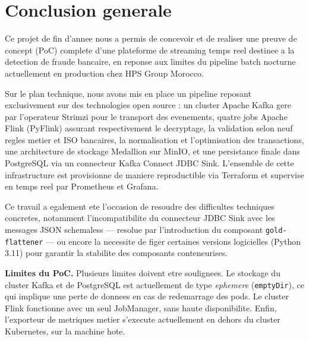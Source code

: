 
\chapter*{Conclusion generale}

Ce projet de fin d'annee nous a permis de concevoir et de realiser une preuve de
concept (PoC) complete d'une plateforme de streaming temps reel destinee a la
detection de fraude bancaire, en reponse aux limites du pipeline batch nocturne
actuellement en production chez HPS Group Morocco.

Sur le plan technique, nous avons mis en place un pipeline reposant exclusivement sur
des technologies open source : un cluster Apache Kafka gere par l'operateur Strimzi
pour le transport des evenements, quatre jobs Apache Flink (PyFlink) assurant
respectivement le decryptage, la validation selon neuf regles metier et ISO
bancaires, la normalisation et l'optimisation des transactions, une architecture de
stockage Medallion sur MinIO, et une persistance finale dans PostgreSQL via un
connecteur Kafka Connect JDBC Sink. L'ensemble de cette infrastructure est
provisionne de maniere reproductible via Terraform et supervise en temps reel par
Prometheus et Grafana.

Ce travail a egalement ete l'occasion de resoudre des difficultes techniques
concretes, notamment l'incompatibilite du connecteur JDBC Sink avec les messages JSON
schemaless --- resolue par l'introduction du composant \texttt{gold-flattener} --- ou
encore la necessite de figer certaines versions logicielles (Python 3.11) pour
garantir la stabilite des composants conteneurises.

\textbf{Limites du PoC.} Plusieurs limites doivent etre soulignees. Le stockage du
cluster Kafka et de PostgreSQL est actuellement de type \textit{ephemere}
(\texttt{emptyDir}), ce qui implique une perte de donnees en cas de redemarrage des
pods. Le cluster Flink fonctionne avec un seul JobManager, sans haute disponibilite.
Enfin, l'exporteur de metriques metier s'execute actuellement en dehors du cluster
Kubernetes, sur la machine hote.

